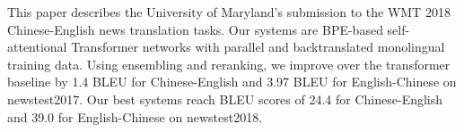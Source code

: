 This paper describes the University of Maryland's submission to the WMT 2018 Chinese-English news translation tasks. Our systems are BPE-based self-attentional Transformer networks with parallel and backtranslated monolingual training data. Using ensembling and reranking, we improve over the transformer baseline by 1.4 BLEU for Chinese-English and 3.97 BLEU for English-Chinese on newstest2017. Our best systems reach BLEU scores of 24.4 for Chinese-English and 39.0 for English-Chinese on newstest2018.
